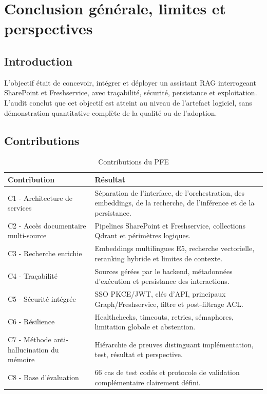 
\chapter{Conclusion générale, limites et perspectives}
\label{chap:conclusion}

\section{Introduction}
L'objectif était de concevoir, intégrer et déployer un assistant RAG interrogeant SharePoint et Freshservice, avec traçabilité, sécurité, persistance et exploitation. L'audit conclut que cet objectif est atteint au niveau de l'artefact logiciel, sans démonstration quantitative complète de la qualité ou de l'adoption.
\section{Contributions}
\begin{table}[H]
\centering
\caption{Contributions du PFE}
\label{tab:contrib_ch8}
\begin{tabular}{p{4.0cm}p{9.5cm}}
\toprule
\textbf{Contribution} & \textbf{Résultat} \\
\midrule
C1 - Architecture de services & Séparation de l’interface, de l’orchestration, des embeddings, de la recherche, de l’inférence et de la persistance. \\
C2 - Accès documentaire multi-source & Pipelines SharePoint et Freshservice, collections Qdrant et périmètres logiques. \\
C3 - Recherche enrichie & Embeddings multilingues E5, recherche vectorielle, reranking hybride et limites de contexte. \\
C4 - Traçabilité & Sources gérées par le backend, métadonnées d’exécution et persistance des interactions. \\
C5 - Sécurité intégrée & SSO PKCE/JWT, clés d’API, principaux Graph/Freshservice, filtre et post-filtrage ACL. \\
C6 - Résilience & Healthchecks, timeouts, retries, sémaphores, limitation globale et abstention. \\
C7 - Méthode anti-hallucination du mémoire & Hiérarchie de preuves distinguant implémentation, test, résultat et perspective. \\
C8 - Base d’évaluation & 66 cas de test codés et protocole de validation complémentaire clairement défini. \\
\bottomrule
\end{tabular}
\end{table}

